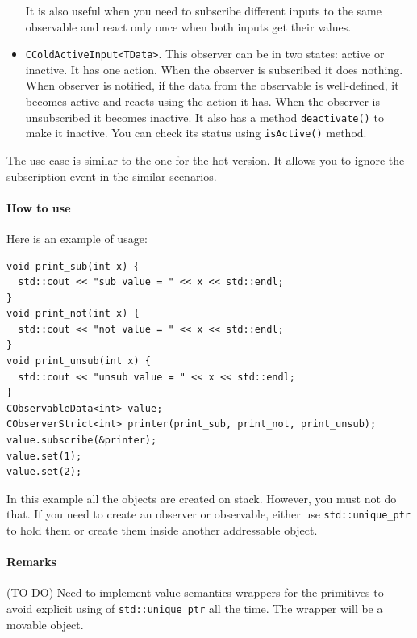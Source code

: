 \documentclass{article}
\begin{document}
\begin{itemize}
It is also useful when you need to subscribe different inputs to the same observable and react only once when both inputs get their values.

\item \verb"CColdActiveInput<TData>". This observer can be in two states: active or inactive. It has one action. When the observer is subscribed it does nothing. When observer is notified, if the data from the observable is well-defined, it becomes active and reacts using the action it has. When the observer is unsubscribed it becomes inactive. It also has a method \verb"deactivate()" to make it inactive. You can check its status using \verb"isActive()" method.
\end{itemize}

The use case is similar to the one for the hot version. It allows you to ignore the subscription event in the similar scenarios.

\paragraph{How to use}

Here is an example of usage:
\begin{verbatim}
void print_sub(int x) {
  std::cout << "sub value = " << x << std::endl;
}
void print_not(int x) {
  std::cout << "not value = " << x << std::endl;
}
void print_unsub(int x) {
  std::cout << "unsub value = " << x << std::endl;
}
CObservableData<int> value;
CObserverStrict<int> printer(print_sub, print_not, print_unsub);
value.subscribe(&printer);
value.set(1);
value.set(2);
\end{verbatim}

In this example all the objects are created on stack. However, you must not do that. If you need to create an observer or observable, either use \verb"std::unique_ptr" to hold them or create them inside another addressable object.

\paragraph{Remarks}

(TO DO) Need to implement value semantics wrappers for the primitives to avoid explicit using of \verb"std::unique_ptr" all the time. The wrapper will be a movable object.
\end{document}
